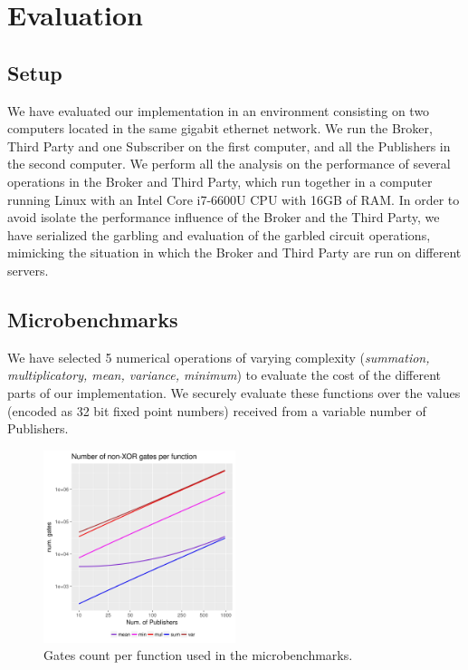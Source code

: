\section{Evaluation}
\label{sec:evaluation}


\subsection{Setup}

We have evaluated our implementation in an environment consisting on two
computers located in the same gigabit ethernet network.  We run the Broker,
Third Party and one Subscriber on the first computer, and all the Publishers in
the second computer.  We perform all the analysis on the performance of several
operations in the Broker and Third Party, which run together in a computer
running Linux with an Intel Core i7-6600U CPU with 16GB of RAM.  In order to
avoid isolate the performance influence of the Broker and the Third Party, we
have serialized the garbling and evaluation of the garbled circuit operations,
mimicking the situation in which the Broker and Third Party are run on
different servers.

\subsection{Microbenchmarks}

We have selected 5 numerical operations of varying complexity (\emph{summation,
multiplicatory, mean, variance, minimum}) to evaluate the cost of the different
parts of our implementation.  We securely evaluate these functions over the values (encoded as 32 bit fixed point numbers) received from a variable number of Publishers.


\begin{figure}
  \includegraphics[width=0.5\textwidth]{plots/gates_log.png}
  \caption{Gates count per function used in the microbenchmarks.}
\end{figure}

